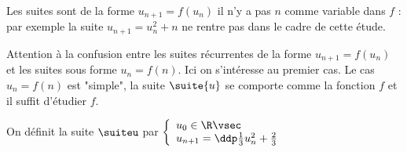 \documentclass[a4paper, 11pt]{article}
\begin{document}
\warning Les suites sont de la forme $u_{n+1}=f(u_n)$ il n'y a pas $n$ comme variable dans $f$ : par exemple la suite $u_{n+1}= u^2_n +n$ ne rentre pas dans le cadre de cette étude. 

\warning Attention à la confusion entre les suites récurrentes de la forme $u_{n+1}=f(u_n)$ et les suites sous forme $u_n=f(n)$. Ici on s'intéresse au premier cas. Le cas $u_n=f(n)$ est "simple", la suite $\suite{u}$ se comporte comme la fonction $f$ et il suffit d'étudier $f$. 

\newpage




On d\'efinit la suite $\suiteu$ par 
$\left\lbrace\begin{array}{l}
u_0\in\R\vsec\\
u_{n+1}=\ddp\frac{1}{3}u_n^2+\frac{2}{3}
\end{array}\right.$
\end{document}
